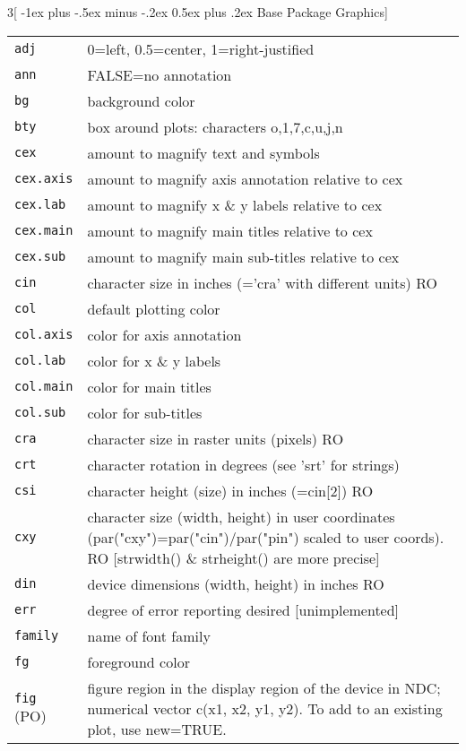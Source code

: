 \documentclass[landscape]{article}
\makeatletter
\renewcommand{\section}{\@startsection{section}{1}{0mm}%
                                {-1ex plus -.5ex minus -.2ex}%
                                {0.5ex plus .2ex}%
                                {\normalfont\large\bfseries}}
\makeatother
\begin{document}
\begin{multicols}{3}[\section{Base Package Graphics}]
\setlength{\tabcolsep}{0pt}
\setlength{\tabularwidth}{0.33\textwidth}
\setlength{\widthleftcol}{0.21\tabularwidth}
\setlength{\widthrightcol}{\tabularwidth}
\addtolength{\widthrightcol}{-\widthleftcol}
\begin{tabular}[t]{@{}p{\widthleftcol}p{\widthrightcol}@{}}
\hline
\verb|adj| & 0=left, 0.5=center, 1=right-justified \\
\verb|ann| & FALSE=no annotation \\
\verb|bg| & background color \\
\verb|bty| & box around plots: characters o,1,7,c,u,j,n \\
\verb|cex| & amount to magnify text and symbols \\
\verb|cex.axis| & amount to magnify axis annotation relative to cex \\
\verb|cex.lab| & amount to magnify x \& y labels relative to cex \\
\verb|cex.main| & amount to magnify main titles relative to cex \\
\verb|cex.sub| & amount to magnify main sub-titles relative to cex \\
\verb|cin| & character size in inches (='cra' with different units) RO \\
\verb|col| & default plotting color \\
\verb|col.axis| & color for axis annotation \\
\verb|col.lab| & color for x \& y labels \\
\verb|col.main| & color for main titles \\
\verb|col.sub| & color for sub-titles \\
\verb|cra| & character size in raster units (pixels) RO \\
\verb|crt| & character rotation in degrees (see 'srt' for strings) \\
\verb|csi| & character height (size) in inches (=cin[2]) RO \\
\verb|cxy| & character size (width, height) in user coordinates (par("cxy")=par("cin")/par("pin") scaled to user coords). RO [strwidth() \& strheight() are more precise] \\
\verb|din| & device dimensions (width, height) in inches RO \\
\verb|err| & degree of error reporting desired [unimplemented] \\
\verb|family| & name of font family \\
\verb|fg| & foreground color \\
\verb|fig| (PO) & figure region in the display region of the device in NDC; numerical vector c(x1, x2, y1, y2). To add to an existing plot, use new=TRUE. \\

\end{tabular}
\end{multicols}
\end{document}
